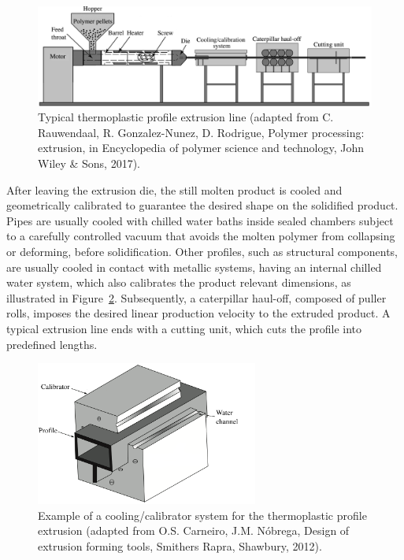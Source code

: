 \begin{figure}
\centering
\includegraphics[width=1.0\textwidth]{chap1/include/figures/extrusion_line.png}
\caption[Typical thermoplastic profile extrusion line.]{Typical thermoplastic profile extrusion line (adapted from C. Rauwendaal, R. Gonzalez-Nunez, D. Rodrigue,
Polymer processing: extrusion, in Encyclopedia of polymer science and technology, John Wiley \& Sons, 2017).}
\label{chap1:fig:polymer_processing_extrusion_line}
\end{figure}

After leaving the extrusion die, the still molten product is cooled and geometrically calibrated to guarantee the desired shape on the solidified product.
Pipes are usually cooled with chilled water baths inside sealed chambers subject to a carefully controlled vacuum that avoids the molten polymer from collapsing or deforming, before solidification.
Other profiles, such as structural components, are usually cooled in contact with metallic systems, having an internal chilled water system, which also calibrates the product relevant dimensions, as illustrated in Figure~\ref{chap1:fig:polymer_processing_calibrator}.
Subsequently, a caterpillar haul-off, composed of puller rolls, imposes the desired linear production velocity to the extruded product.
A typical extrusion line ends with a cutting unit, which cuts the profile into predefined lengths.

\begin{figure}[!htb]
\centering
\includegraphics[width=0.65\textwidth]{chap1/include/figures/calibrator1.png}
\caption[Example of a cooling/calibrator system for the thermoplastic profile extrusion.]{Example of a cooling/calibrator system for the thermoplastic profile extrusion (adapted from O.S. Carneiro, J.M. N\'obrega, Design of extrusion forming tools, Smithers Rapra, Shawbury, 2012).}
\label{chap1:fig:polymer_processing_calibrator}
\end{figure}

